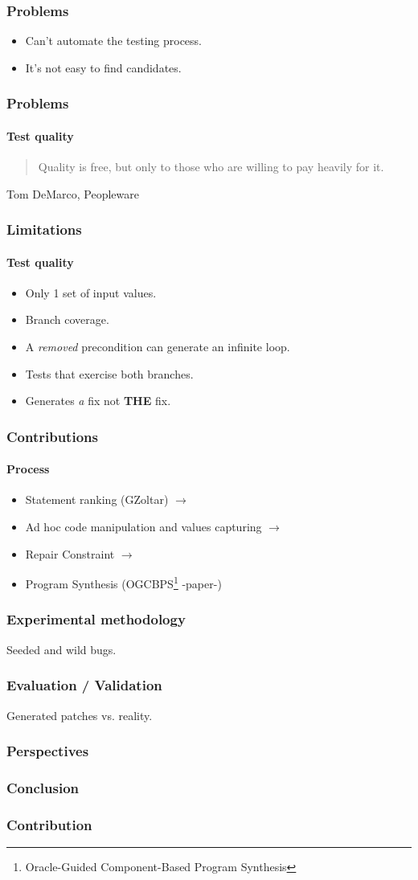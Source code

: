 \documentclass[onlymath]{beamer}
\begin{document}
  \frame
  {
    \frametitle{Problems}
\begin{itemize}
\item Can't automate the testing process.
\item It's not easy to find candidates.
\end{itemize}    
  }

  \frame
  {
    \frametitle{Problems}
    \framesubtitle{Test quality}
   \begin{quote}
    Quality is free, but only to those who are willing to pay heavily for it.
   \end{quote}
    Tom DeMarco, Peopleware   
  }
  
  \frame
  {
    \frametitle{Limitations}
    \framesubtitle{Test quality}
\begin{itemize}
\item Only 1 set of input values.
\item Branch coverage.
\item A \textit{removed} precondition can generate an infinite loop.
\item Tests that exercise both branches.
\item Generates \textit{a} fix not \textbf{THE} fix.
\end{itemize}        
  }

  \frame
  {  
    \frametitle{Contributions}
      \framesubtitle{Process}
\begin{itemize}
\item Statement ranking (GZoltar)  $\rightarrow$
\item Ad hoc code manipulation and values capturing $\rightarrow$
\item Repair Constraint  $\rightarrow$
\item Program Synthesis (OGCBPS\footnote{Oracle-Guided Component-Based Program Synthesis} -paper-)
\end{itemize}
}


  \frame
  {
    \frametitle{Experimental methodology}
    Seeded and wild bugs.
  }
  
  \frame
  {
    \frametitle{Evaluation / Validation}
    Generated patches vs. reality.
  }
  
  \frame
  {
    \frametitle{Perspectives}
    
  }
  
  \frame
  {
    \frametitle{Conclusion}
    
  }

  \frame
  {
    \frametitle{Contribution}
    
  }
  
\end{document}
